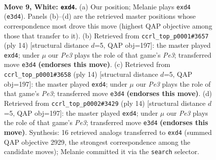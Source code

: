 \documentclass[11pt]{article}
\begin{document}
\clearpage

\begin{figure}[p]\centering
\begin{subfigure}{0.46\textwidth}\centering
\resizebox{\linewidth}{!}{%
\newchessgame
\chessboard[
  setfen={rnbqkb1r/1p3pp1/p3pn2/7p/P2p4/1B2PN2/1P3PPP/RNBQ1RK1 w kq - 0 9},
  showmover=false,
  pgfstyle=straightmove, color=movearrow, markmove={e3-d4}
]}
\caption{}
\end{subfigure}\hfill
\begin{subfigure}{0.46\textwidth}\centering
\resizebox{\linewidth}{!}{%
\newchessgame
\chessboard[
  setfen={rnbqkb1r/1p3ppp/p3pn2/8/3p4/1B2PN2/PP3PPP/RNBQ1RK1 w kq - 0 8},
  showmover=false,
  pgfstyle=straightmove, color=movearrow, markmove={e3-d4}
]}
\caption{}
\end{subfigure}
\\[4pt]
\begin{subfigure}{0.46\textwidth}\centering
\resizebox{\linewidth}{!}{%
\newchessgame
\chessboard[
  setfen={rnbqkb1r/1p3ppp/p3pn2/8/3p4/1B2PN2/PP3PPP/RNBQ1RK1 w kq - 0 8},
  showmover=false,
  pgfstyle=straightmove, color=movearrow, markmove={e3-d4}
]}
\caption{}
\end{subfigure}\hfill
\begin{subfigure}{0.46\textwidth}\centering
\resizebox{\linewidth}{!}{%
\newchessgame
\chessboard[
  setfen={rnbqkb1r/1p3ppp/p3pn2/8/3p4/1B2PN2/PP3PPP/RNBQ1RK1 w kq - 0 8},
  showmover=false,
  pgfstyle=straightmove, color=movearrow, markmove={e3-d4}
]}
\caption{}
\end{subfigure}
\caption{\textbf{Move 9, White: \texttt{exd4}.} (a) Our position; Melanie plays \texttt{exd4} (\texttt{e3d4}). Panels (b)--(d) are the retrieved master positions whose correspondence most drove this move (highest QAP objective among those that transfer to it). (b) Retrieved from \texttt{ccrl\_top\_p0001\#3657} (ply 14) [structural distance $d$=5, QAP obj=197]: the master played \texttt{exd4}; under $\mu$ our \emph{Pe3} plays the role of that game's \emph{Pe3}; transferred move \texttt{e3d4} \textbf{(endorses this move)}. (c) Retrieved from \texttt{ccrl\_top\_p0001\#3658} (ply 14) [structural distance $d$=5, QAP obj=197]: the master played \texttt{exd4}; under $\mu$ our \emph{Pe3} plays the role of that game's \emph{Pe3}; transferred move \texttt{e3d4} \textbf{(endorses this move)}. (d) Retrieved from \texttt{ccrl\_top\_p0002\#3429} (ply 14) [structural distance $d$=5, QAP obj=197]: the master played \texttt{exd4}; under $\mu$ our \emph{Pe3} plays the role of that game's \emph{Pe3}; transferred move \texttt{e3d4} \textbf{(endorses this move)}. Synthesis: 16 retrieved analogs transferred to \texttt{exd4} (summed QAP objective 2929, the strongest correspondence among the candidate moves); Melanie committed it via the \texttt{search} selector.}
\label{fig:thought-m16}
\end{figure}
\end{document}
